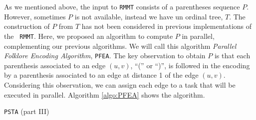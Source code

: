 As we mentioned above, the input to {\tt RMMT} consists of a
parentheses sequence $P$. However, sometimes $P$ is not available,
instead we have un ordinal tree, $T$. The construction of $P$ from $T$
has not been considered in previous implementations of the {\tt
  RMMT}. Here, we proposed an algorithm to compute $P$ in parallel,
complementing our previous algorithms. We will call this algorithm
\emph{Parallel Folklore Encoding Algorithm}, {\tt PFEA}. The key
observation to obtain $P$ is that each parenthesis associated to an
edge $(u,v)$, ``('' or ``)'', is followed in the encoding by a
parenthesis associated to an edge at distance 1 of the edge
$(u,v)$. Considering this observation, we can assign each edge to a task
that will be executed in parallel. Algorithm \ref{algo:PFEA} shows the algorithm.


\begin{minipage}[t]{.45\textwidth}
  \begin{algorithm}[H]
\small
  \LinesNumbered
  \SetAlgoNoEnd
  \DontPrintSemicolon
  \setcounter{AlgoLine}{1}\ShowLn
  \caption{{\tt PSTA} (part III)}
  \label{algo:PSTA3}
  \end{algorithm}
\end{minipage}
